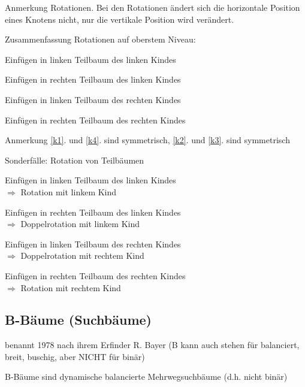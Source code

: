
Anmerkung Rotationen. Bei den Rotationen ändert sich die {\flqq horizontale Position\frqq} eines Knotens nicht, nur die vertikale Position wird verändert.

Zusammenfassung Rotationen auf oberstem Niveau:
\begin{compactenum}
	\item\label{k1} Einfügen in linken Teilbaum des linken Kindes
	\item\label{k2} Einfügen in rechten Teilbaum des linken Kindes
	\item\label{k3} Einfügen in linken Teilbaum des rechten Kindes
	\item\label{k4} Einfügen in rechten Teilbaum des rechten Kindes
\end{compactenum}
Anmerkung \ref*{k1}. und \ref*{k4}. sind symmetrisch, \ref*{k2}. und \ref*{k3}. sind symmetrisch

Sonderfälle: Rotation von Teilbäumen
\begin{compactitem}
	\item Einfügen in linken Teilbaum des linken Kindes\\
	$\Rightarrow$ Rotation mit linkem Kind
	\item Einfügen in rechten Teilbaum des linken Kindes\\
	$\Rightarrow$ Doppelrotation mit linkem Kind
	\item Einfügen in linken Teilbaum des rechten Kindes\\
	$\Rightarrow$ Doppelrotation mit rechtem Kind
	\item Einfügen in rechten Teilbaum des rechten Kindes\\
	$\Rightarrow$ Rotation mit rechtem Kind
\end{compactitem}

\subsection{B-Bäume (Suchbäume)}
\begin{compactitem}
	\item benannt 1978 nach ihrem Erfinder R. Bayer (B kann auch stehen für balanciert, breit, buschig, aber NICHT für binär)
	\item B-Bäume sind dynamische balancierte Mehrwegsuchbäume (d.h. nicht binär)
\end{compactitem}


